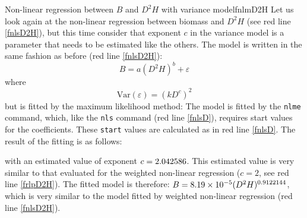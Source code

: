 \begin{filrouge}{Non-linear regression between $B$ and $D^2H$ with variance model}{fnlmD2H}%
Let us look again at the non-linear regression between biomass and $D^2H$ (see red line \ref{fnlsD2H}), but this time consider that exponent $c$ in the variance model is a parameter that needs to be estimated like the others. The model is written in the same fashion as before (red line \ref{fnlsD2H}):
\[
B=a(D^2H)^b+\varepsilon
\]
where
\[
\mathrm{Var}(\varepsilon)=(kD^c)^2
\]
but is fitted by the maximum likelihood method:
%
The model is fitted by the \texttt{nlme} command, which, like the \texttt{nls} command (red line \ref{fnlsD}), requires start values for the coefficients. These \texttt{start} values are calculated as in red line \ref{fnlsD}. The result of the fitting is as follows:

%
with an estimated value of exponent $c=\mbox{2.042586}$. This estimated value is very similar to that evaluated for the weighted non-linear regression ($c=2$, see red line \ref{frlpD2H}). The fitted model is therefore: $B=\mbox{8.19}\times10^{-5}(D^2H)^{0.9122144}$, which is very similar to the model fitted by weighted non-linear regression (red line \ref{fnlsD2H}).
\end{filrouge}

